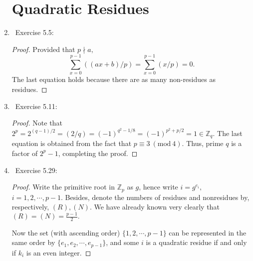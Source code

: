 \documentclass[11pt]{article}
\newcommand\0{\mathbf{0}}
\newcommand\ZZ{\mathbb{Z}}
\newcommand\<{\langle}
\renewcommand\>{\rangle}
\renewcommand\mod[1]{\ (\mathrm{mod}\ #1)}
\begin{document}
\begin{enumerate}
\section{Quadratic Residues}
\item\ 
Exercise 5.5:
\begin{proof}
  Provided that $p \nmid a,$ \[\displaystyle\sum_{x=0}^{p-1}((ax+b)/p) = \sum_{x=0}^{p-1}(x/p) = 0.\] The last equation holds because there are as many non-residues as residues.
\end{proof}
\item\ 
Exercise 5.11:
\begin{proof}
  Note that $2^p = 2^{(q-1)/2} = (2/q) = (-1)^{{q^2-1}/8} = (-1)^{{p^2+p}/2} = 1 \in \ZZ_q.$ The last equation is obtained from the fact that $p \equiv 3 \mod{4}.$ Thus, prime $q$ is a factor of $2^p-1$, completing the proof.
\end{proof}
\item\ 
Exercise 5.29:
\begin{proof}
  Write the primitive root in $\ZZ_p$ as $g$, hence write $i = g^{e_i},$ $i = 1, 2, \cdots, p-1.$ Besides, denote the numbers of residues and nonresidues by, respectively, $(R), (N).$ We have already known very clearly that $(R) = (N) = \frac{p-1}{2}.$
  
  Now the set (with ascending order) $\{1,2,\cdots, p-1\}$ can be represented in the same order by $\{e_1, e_2, \cdots, e_{p-1}\}$, and some $i$ is a quadratic residue if and only if $k_i$ is an even integer. 
  

\end{proof}
\end{enumerate}
\end{document}
